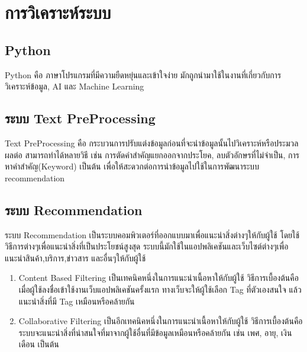 \section{การวิเคราะห์ระบบ}
\subsection{Python}
Python คือ ภาษาโปรแกรมที่มีความยืดหยุ่นและเข้าใจง่าย มักถูกนำมาใช้ในงานที่เกี่ยวกับการวิเคราะห์ข้อมูล, AI และ Machine Learning 
\cite{python}
\subsection{ระบบ Text PreProcessing}
Text PreProcessing คือ กระบวนการปรับแต่งข้อมูลก่อนที่จะนำข้อมูลนั้นไปวิเคราะห์หรือประมวลผลต่อ สามารถทำได้หลายวิธี เช่น การตัดคำสำคัญแยกออกจากประโยค, ลบตัวอักษรที่ไม่จำเป็น, การหาคำสำคัญ(Keyword) เป็นต้น เพื่อให้สะดวกต่อการนำข้อมูลไปใช้ในการพัฒนาระบบ recommendation
\cite{prepros}

\subsection{ระบบ Recommendation}
ระบบ Recommendation เป็นระบบคอมพิวเตอร์ที่ออกแบบมาเพื่อแนะนำสิ่งต่างๆให้กับผู้ใช้ โดยใช้วิธีการต่างๆเพื่อแนะนำสิ่งที่เป็นประโยชน์สูงสุด ระบบนี้มักใช้ในแอปพลิเคชันและเว็บไซต์ต่างๆเพื่อแนะนำสินค้า,บริการ,ข่าวสาร และอื่นๆให้กับผู้ใช้
\cite{recom}
\begin{enumerate}
    \item Content Based Filtering เป็นเทคนิคหนึ่งในการแนะนำเนื้อหาให้กับผู้ใช้ วิธีการเบื้องต้นคือ เมื่อผู้ใช้ลงชื่อเข้าใช้งานเว็บแอปพลิเคชันครั้งแรก ทางเว็บจะให้ผู้ใช้เลือก Tag ที่ตัวเองสนใจ แล้วแนะนำสิ่งที่มี Tag เหมือนหรือคล้ายกัน
    \item Collaborative Filtering เป็นอีกเทคนิคหนึ่งในการแนะนำเนื้อหาให้กับผู้ใช้ วิธีการเบื้องต้นคือ ระบบจะแนะนำสิ่งที่น่าสนใจที่มาจากผู้ใช้อื่นที่มีข้อมูลเหมือนหรือคล้ายกัน เช่น เพศ, อายุ, เงินเดือน เป็นต้น 
\end{enumerate}



